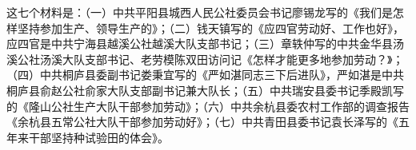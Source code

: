 \begin{maonote}
这七个材料是：（一）中共平阳县城西人民公社委员会书记廖锡龙写的《我们是怎样坚持参加生产、领导生产的》；（二）钱天镇写的《应四官劳动好、工作也好》，应四官是中共宁海县越溪公社越溪大队支部书记；（三）章轶仲写的中共金华县汤溪公社汤溪大队支部书记、老劳模陈双田访问记《怎样才能更多地参加劳动？》；（四）中共桐庐县委副书记娄秉宜写的《严如湛同志三下后进队》，严如湛是中共桐庐县俞赵公社俞家大队支部副书记兼大队长；（五）中共瑞安县委书记季殿凯写的《隆山公社生产大队干部参加劳动》；（六）中共余杭县委农村工作部的调查报告《余杭县五常公社大队干部参加劳动好》；（七）中共青田县委书记袁长泽写的《五年来干部坚持种试验田的体会》。
\end{maonote}
